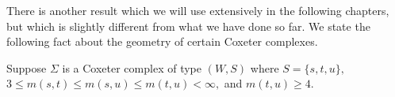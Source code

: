 \documentclass[class=book, crop=false,12 pt]{standalone}
\begin{document}
There is another result which we will use extensively in the following chapters, but which is slightly different from what we have done so far. We state the following fact about the geometry of certain Coxeter complexes. 

\begin{lemma}
	\label{lem:tri}
	Suppose $\Sigma$ is a Coxeter complex of type $(W,S)$ where $S=\{s,t,u\},$ $3\le m(s,t)\le m(s,u)\le m(t,u)<\infty,$ and $m(t,u)\ge 4.$ 
\end{lemma}
\end{document}
